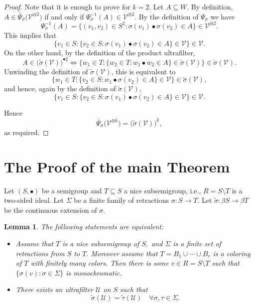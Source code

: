 \documentclass[12pt]{amsart}
\newtheorem{lemma}{Lemma}
\begin{document}
\begin{proof}
Note that it is enough to prove for $k=2$. Let $A\subseteq W$. By definition,
$
A\in \widetilde{\Psi_\sigma}\bigl(\mathcal{V}^{\otimes 2}\bigr)
$
if and only if $\Psi_\sigma^{-1}(A)\in \mathcal{V}^{\otimes 2}.
$ By the definition of $\Psi_\sigma$ we have 
\[
\Psi_\sigma^{-1}(A)
=
\bigl\{(v_1, v_2)\in S^2:
\sigma(v_1)\bullet \sigma(v_2)\in A\bigr\} \in \mathcal{V}^{\otimes 2}.
\]
This implies that 
\[
\{v_1 \in S: \{v_2 \in S: \sigma(v_1)\bullet \sigma(v_2) \in A\} \in \mathcal{V}\} \in \mathcal{V}.
\]
On the other hand, by the definition of the product ultrafilter,
\[
A\in \bigl(\widetilde{\sigma}(\mathcal{V})\bigr)^{\bullet 2}
\iff
\bigl\{w_1\in T:
\{w_2\in T: w_1\bullet w_2\in A\}\in \widetilde{\sigma}(\mathcal{V})
\bigr\}\in \widetilde{\sigma}(\mathcal{V}).
\]
Unwinding the definition of $\widetilde{\sigma}(\mathcal{V})$, this is equivalent to
\[
\bigl\{w_1\in T:
\{v_2\in S: w_1\bullet \sigma(v_2)\in A\}\in \mathcal{V}
\bigr\}\in \widetilde{\sigma}(\mathcal{V}),
\]
and hence, again by the definition of $\widetilde{\sigma}(\mathcal{V})$,
\[
\bigl\{v_1\in S:
\{v_2\in S: \sigma(v_1)\bullet \sigma(v_2)\in A\}\in \mathcal{V}
\bigr\}\in \mathcal{V}.
\]

Hence
\[
\widetilde{\Psi_\sigma}\bigl(\mathcal{V}^{\otimes k}\bigr)
=
\bigl(\widetilde{\sigma}(\mathcal{V})\bigr)^k,
\]
as required.
\end{proof}


\section{The Proof of the main Theorem}
Let $(S,\bullet)$ be a semigroup and $T \subseteq S$ a nice subsemigroup, i.e., $R = S \setminus T$ is a two-sided ideal. Let $\Sigma$ be a finite family of retractions $\sigma: S \to T$. Let $\widetilde{\sigma}: \beta S \rightarrow \beta T$ be the continuous extension of $\sigma.$




\begin{lemma}\label{Lemma2}
The following statements are equivalent:

\begin{itemize}
    \item[(a)] Assume that $T$ is a nice subsemigroup of $S,$ and $\Sigma$ is a finite set of retractions from $S$ to $T.$ Moreover assume that $T=B_1 \cup \cdots \cup B_r$ is a coloring of $T$ with finitely many colors. Then there is some $v \in R=S \setminus T$ such that $\{\sigma(v) : \sigma \in \Sigma\}$ is monochromatic. 

   \item [(b)]There exists an ultrafilter $\mathcal{U}$ on $S$ such that
\[
\widetilde{\sigma}(\mathcal{U}) =\widetilde{\tau}(\mathcal{U}) \quad \forall \sigma,\tau \in \Sigma.
\]

\end{itemize}
\end{lemma}
\end{document}
